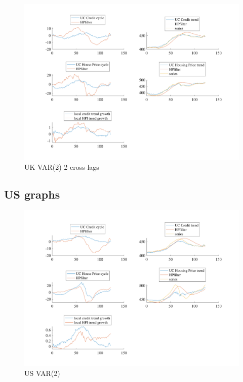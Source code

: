 \documentclass[
  12pt,
]{article}
\begin{document}
\begin{figure}

{\centering \includegraphics[width=0.85\linewidth]{../../Regression/Bayesian_UC_VAR2_drift_Crosscycle2lags/OutputData/cycles_UK} 

}

\caption{UK VAR(2) 2 cross-lags}\label{fig:unnamed-chunk-5}
\end{figure}

\clearpage

\hypertarget{us-graphs}{%
\subsection{US graphs}\label{us-graphs}}

\begin{figure}

{\centering \includegraphics[width=0.85\linewidth]{../../Regression/Bayesian_UC_VAR2_drift/OutputData/cycles_US} 

}

\caption{US VAR(2)}\label{fig:unnamed-chunk-6}
\end{figure}
\end{document}
